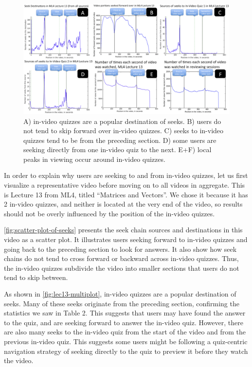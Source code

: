 \documentclass{sigchi}
\begin{document}
\begin{figure}
\includegraphics[width=2.0\columnwidth]{lec13-multiplot}
\caption{A) in-video quizzes are a popular destination of seeks. B) users do not tend to skip forward over in-video quizzes. C) seeks to in-video quizzes tend to be from the preceding section. D) some users are seeking directly from one in-video quiz to the next. E+F) local peaks in viewing occur around in-video quizzes.}
\label{fig:lec13-multiplot}
\end{figure}

In order to explain why users are seeking to and from in-video quizzes, let us first visualize a representative video before moving on to all videos in aggregate. This is Lecture 13 from ML4, titled ``Matrices and Vectors''. We chose it because it has 2 in-video quizzes, and neither is located at the very end of the video, so results should not be overly influenced by the position of the in-video quizzes.

\autoref{fig:scatter-plot-of-seeks} presents the seek chain sources and destinations in this video as a scatter plot. It illustrates users seeking forward to in-video quizzes and going back to the preceding section to look for answers. It also show how seek chains do not tend to cross forward or backward across in-video quizzes. Thus, the in-video quizzes subdivide the video into smaller sections that users do not tend to skip between.

As shown in \autoref{fig:lec13-multiplot}, in-video quizzes are a popular destination of seeks. Many of these seeks originate from the preceding section, confirming the statistics we saw in Table 2. This suggests that users may have found the answer to the quiz, and are seeking forward to answer the in-video quiz. However, there are also many seeks to the in-video quiz from the start of the video and from the previous in-video quiz. This suggests some users might be following a quiz-centric navigation strategy of seeking directly to the quiz to preview it before they watch the video.
\end{document}
